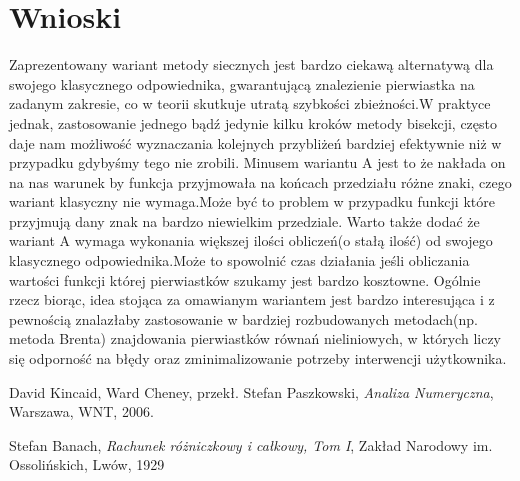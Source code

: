 \documentclass[11pt,wide]{article}
\begin{document}
\section{Wnioski}
Zaprezentowany wariant metody siecznych jest bardzo ciekawą alternatywą dla swojego klasycznego odpowiednika, gwarantującą znalezienie pierwiastka na zadanym zakresie, co w teorii skutkuje utratą szybkości zbieżności.W praktyce jednak, zastosowanie jednego bądź jedynie kilku kroków metody bisekcji, często daje nam możliwość wyznaczania kolejnych przybliżeń bardziej efektywnie niż w przypadku gdybyśmy tego nie zrobili.\newline
Minusem wariantu A jest to że nakłada on na nas warunek by funkcja przyjmowała na końcach przedziału różne znaki, czego wariant klasyczny nie wymaga.Może być to problem w przypadku funkcji które przyjmują dany znak na bardzo niewielkim przedziale. Warto także dodać że wariant A wymaga wykonania większej ilości obliczeń(o stałą ilość) od swojego klasycznego odpowiednika.Może to spowolnić czas działania jeśli obliczania wartości funkcji której pierwiastków szukamy jest bardzo kosztowne.
Ogólnie rzecz biorąc, idea stojąca za omawianym wariantem jest bardzo interesująca i z pewnością znalazłaby zastosowanie w bardziej rozbudowanych metodach(np. metoda Brenta) znajdowania pierwiastków równań nieliniowych, w których liczy się odporność na błędy oraz zminimalizowanie potrzeby interwencji użytkownika.


\begin{thebibliography}{10}

  David Kincaid, Ward Cheney,
  przekł. Stefan Paszkowski,
  \emph{Analiza Numeryczna},
  Warszawa, WNT, 2006.
  
 Stefan Banach,
 \emph{Rachunek różniczkowy i całkowy, Tom I},
 Zakład Narodowy im. Ossolińskich, Lwów, 1929
 

\end{thebibliography}
\end{document}
